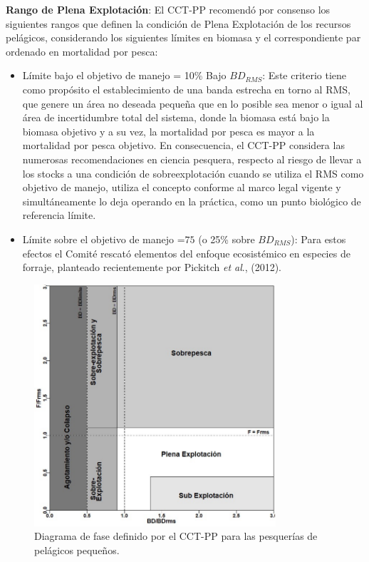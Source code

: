 \documentclass[
  spanish,
]{article}
\begin{document}
\textbf{Rango de Plena Explotación}: El CCT-PP recomendó por consenso
los siguientes rangos que definen la condición de Plena Explotación de
los recursos pelágicos, considerando los siguientes límites en biomasa y
el correspondiente par ordenado en mortalidad por pesca:

\vspace{0.5cm}

\begin{itemize}
\item
  Límite bajo el objetivo de manejo = 10\% Bajo \(BD_{RMS}\): Este
  criterio tiene como propósito el establecimiento de una banda estrecha
  en torno al RMS, que genere un área no deseada pequeña que en lo
  posible sea menor o igual al área de incertidumbre total del sistema,
  donde la biomasa está bajo la biomasa objetivo y a su vez, la
  mortalidad por pesca es mayor a la mortalidad por pesca objetivo. En
  consecuencia, el CCT-PP considera las numerosas recomendaciones en
  ciencia pesquera, respecto al riesgo de llevar a los stocks a una
  condición de sobreexplotación cuando se utiliza el RMS como objetivo
  de manejo, utiliza el concepto conforme al marco legal vigente y
  simultáneamente lo deja operando en la práctica, como un punto
  biológico de referencia límite.
\item
  Límite sobre el objetivo de manejo =\(75%
  \) (o 25\% sobre \(BD_{RMS}\)): Para estos efectos el Comité rescató
  elementos del enfoque ecosistémico en especies de forraje, planteado
  recientemente por Pickitch \emph{et al}., (2012).
\end{itemize}

\vspace{0.5cm}

\begin{figure}[htb!]
\centering
\includegraphics[width=0.8\textwidth]{Figuras/Fig8_InformeFinal.pdf}
\caption{Diagrama de fase definido por el CCT-PP para las pesquerías de pelágicos pequeños.}
\label{Fig8}
\end{figure}
\end{document}
